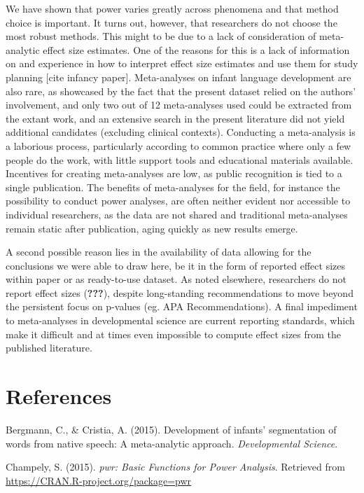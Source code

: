 \documentclass[english,floatsintext,man]{apa6}
\newcounter{author}
\begin{document}
We have shown that power varies greatly across phenomena and that method
choice is important. It turns out, however, that researchers do not
choose the most robust methods. This might to be due to a lack of
consideration of meta-analytic effect size estimates. One of the reasons
for this is a lack of information on and experience in how to interpret
effect size estimates and use them for study planning {[}cite infancy
paper{]}. Meta-analyses on infant language development are also rare, as
showcased by the fact that the present dataset relied on the authors'
involvement, and only two out of 12 meta-analyses used could be
extracted from the extant work, and an extensive search in the present
literature did not yield additional candidates (excluding clinical
contexts). Conducting a meta-analysis is a laborious process,
particularly according to common practice where only a few people do the
work, with little support tools and educational materials available.
Incentives for creating meta-analyses are low, as public recognition is
tied to a single publication. The benefits of meta-analyses for the
field, for instance the possibility to conduct power analyses, are often
neither evident nor accessible to individual researchers, as the data
are not shared and traditional meta-analyses remain static after
publication, aging quickly as new results emerge.

A second possible reason lies in the availability of data allowing for
the conclusions we were able to draw here, be it in the form of reported
effect sizes within paper or as ready-to-use dataset. As noted
elsewhere, researchers do not report effect sizes ({\textbf{???}}),
despite long-standing recommendations to move beyond the persistent
focus on p-values (eg. APA Recommendations). A final impediment to
meta-analyses in developmental science are current reporting standards,
which make it difficult and at times even impossible to compute effect
sizes from the published literature.

\section*{References}\label{references}

Bergmann, C., \& Cristia, A. (2015). Development of infants'
segmentation of words from native speech: A meta-analytic approach.
\emph{Developmental Science}.

Champely, S. (2015). \emph{pwr: Basic Functions for Power Analysis}.
Retrieved from \url{https://CRAN.R-project.org/package=pwr}
\end{document}
